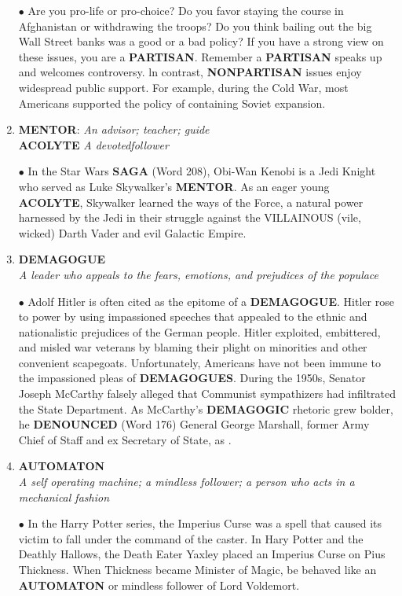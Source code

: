\documentclass{book}
\begin{document}
\begin{enumerate}
$ \bullet $ Are you pro-life or pro-choice? Do you favor staying
the course in Afghanistan or withdrawing the troops?
Do you think bailing out the big Wall Street banks was
a good or a bad policy? If you have a strong view on these issues, you are a \textbf{PARTISAN}. Remember a
\textbf{PARTISAN} speaks up and welcomes controversy. ln
contrast, \textbf{NONPARTISAN} issues enjoy widespread
public support. For example, during the Cold War,
most Americans supported the policy of containing
Soviet expansion.

\item \textbf{MENTOR}:
\textit{An advisor; teacher; guide}\\
\textbf{ACOLYTE}
\textit{A devotedfollower}

$ \bullet $ In the Star Wars \textbf{SAGA} (Word 208), Obi-Wan Kenobi is a Jedi Knight who served as Luke Skywalker's
\textbf{MENTOR}. As an eager young \textbf{ACOLYTE}, Skywalker learned the ways of the Force, a natural power
harnessed by the Jedi in their struggle against the
VILLAINOUS (vile, wicked) Darth Vader and evil
Galactic Empire.

\item\textbf{DEMAGOGUE}\\
\textit{A leader who appeals to the fears, emotions,
and prejudices of the populace}

$ \bullet $ Adolf Hitler is often cited as the epitome of a \textbf{DEMAGOGUE}. Hitler rose to power by using impassioned
speeches that appealed to the ethnic and nationalistic
prejudices of the German people. Hitler exploited,
embittered, and misled war veterans by blaming their
plight on minorities and other convenient scapegoats.
Unfortunately, Americans have not been immune to
the impassioned pleas of \textbf{DEMAGOGUES}. During the
1950s, Senator Joseph McCarthy falsely alleged that
Communist sympathizers had infiltrated the State Department. As McCarthy's \textbf{DEMAGOGIC} rhetoric
grew bolder, he \textbf{DENOUNCED} (Word 176) General
George Marshall, former Army Chief of Staff and ex Secretary of State, as .

\item \textbf{AUTOMATON}\\
\textit{A self operating machine; a mindless follower;
a person who acts in a mechanical fashion}

$ \bullet $ In the Harry Potter series, the Imperius Curse was a
spell that caused its victim to fall under the command
of the caster. In Hary Potter and the Deathly
Hallows, the Death Eater Yaxley placed an Imperius
Curse on Pius Thickness. When Thickness became
Minister of Magic, be behaved like an \textbf{AUTOMATON}
or mindless follower of Lord Voldemort.


\end{enumerate}
\end{document}
